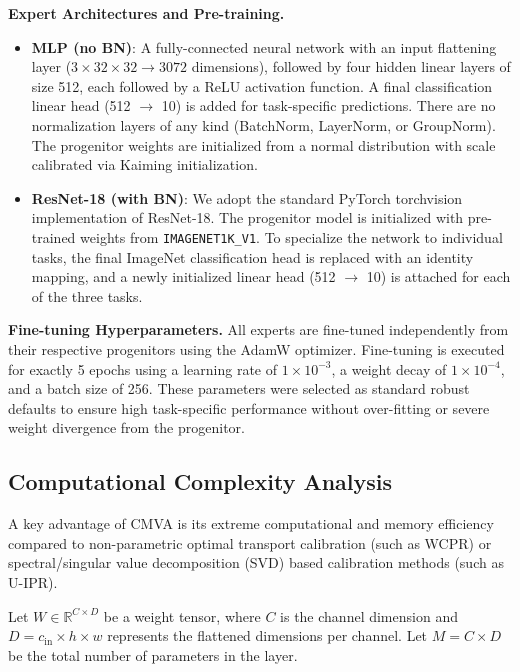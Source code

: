 \documentclass{article}
\theoremstyle{plain}
\theoremstyle{definition}
\theoremstyle{remark}
\begin{document}
\textbf{Expert Architectures and Pre-training.}
\begin{itemize}
  \item \textbf{MLP (no BN)}: A fully-connected neural network with an input flattening layer ($3 \times 32 \times 32 \to 3072$ dimensions), followed by four hidden linear layers of size 512, each followed by a ReLU activation function. A final classification linear head (512 $\to$ 10) is added for task-specific predictions. There are no normalization layers of any kind (BatchNorm, LayerNorm, or GroupNorm). The progenitor weights are initialized from a normal distribution with scale calibrated via Kaiming initialization.
  \item \textbf{ResNet-18 (with BN)}: We adopt the standard PyTorch torchvision implementation of ResNet-18. The progenitor model is initialized with pre-trained weights from \texttt{IMAGENET1K\_V1}. To specialize the network to individual tasks, the final ImageNet classification head is replaced with an identity mapping, and a newly initialized linear head (512 $\to$ 10) is attached for each of the three tasks.
\end{itemize}

\textbf{Fine-tuning Hyperparameters.}
All experts are fine-tuned independently from their respective progenitors using the AdamW optimizer. Fine-tuning is executed for exactly 5 epochs using a learning rate of $1\times 10^{-3}$, a weight decay of $1\times 10^{-4}$, and a batch size of 256. These parameters were selected as standard robust defaults to ensure high task-specific performance without over-fitting or severe weight divergence from the progenitor.

\subsection{Computational Complexity Analysis}
\label{app:complexity}

A key advantage of CMVA is its extreme computational and memory efficiency compared to non-parametric optimal transport calibration (such as WCPR) or spectral/singular value decomposition (SVD) based calibration methods (such as U-IPR).

Let $W \in \mathbb{R}^{C \times D}$ be a weight tensor, where $C$ is the channel dimension and $D = c_{\text{in}} \times h \times w$ represents the flattened dimensions per channel. Let $M = C \times D$ be the total number of parameters in the layer.
\end{document}
